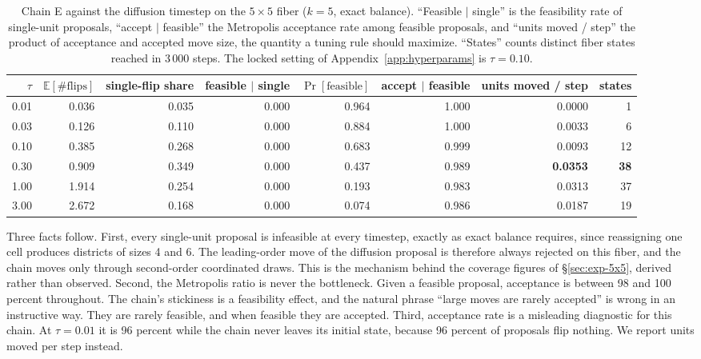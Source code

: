 \documentclass[11pt]{article}
\newcommand{\E}{\mathbb{E}}
\begin{document}
\begin{table}[htbp]
\centering
\small
\setlength{\tabcolsep}{4pt}
\begin{tabular}{rrrrrrrr}
\toprule
$\tau$ & $\E[\#\mathrm{flips}]$ & single-flip share & feasible $\mid$ single
  & $\Pr[\text{feasible}]$ & accept $\mid$ feasible & units moved / step & states \\
\midrule
0.01 & 0.036 & 0.035 & 0.000 & 0.964 & 1.000 & 0.0000 & 1 \\
0.03 & 0.126 & 0.110 & 0.000 & 0.884 & 1.000 & 0.0033 & 6 \\
0.10 & 0.385 & 0.268 & 0.000 & 0.683 & 0.999 & 0.0093 & 12 \\
0.30 & 0.909 & 0.349 & 0.000 & 0.437 & 0.989 & \textbf{0.0353} & \textbf{38} \\
1.00 & 1.914 & 0.254 & 0.000 & 0.193 & 0.983 & 0.0313 & 37 \\
3.00 & 2.672 & 0.168 & 0.000 & 0.074 & 0.986 & 0.0187 & 19 \\
\bottomrule
\end{tabular}
\caption{Chain E against the diffusion timestep on the $5 \times 5$
  fiber ($k = 5$, exact balance). ``Feasible $\mid$ single'' is the
  feasibility rate of single-unit proposals, ``accept $\mid$
  feasible'' the Metropolis acceptance rate among feasible
  proposals, and ``units moved / step'' the product of acceptance and
  accepted move size, the quantity a tuning rule should maximize.
  ``States'' counts distinct fiber states reached in 3\,000 steps.
  The locked setting of Appendix~\ref{app:hyperparams} is
  $\tau = 0.10$.}\label{tab:mobility}
\end{table}

Three facts follow. First, every single-unit proposal is infeasible at
every timestep, exactly as exact balance requires, since reassigning
one cell produces districts of sizes 4 and 6. The leading-order move
of the diffusion proposal is therefore always rejected on this fiber,
and the chain moves only through second-order coordinated draws. This
is the mechanism behind the coverage figures of \S\ref{sec:exp-5x5},
derived rather than observed. Second, the Metropolis ratio is never
the bottleneck. Given a feasible proposal, acceptance is between 98
and 100 percent throughout. The chain's stickiness is a feasibility
effect, and the natural phrase ``large moves are rarely accepted'' is
wrong in an instructive way. They are rarely feasible, and when
feasible they are accepted. Third, acceptance rate is a misleading
diagnostic for this chain. At $\tau = 0.01$ it is 96 percent while
the chain never leaves its initial state, because 96 percent of
proposals flip nothing. We report units moved per step instead.
\end{document}

